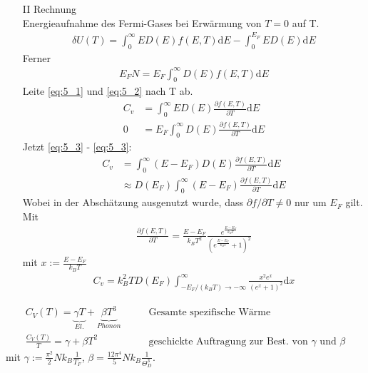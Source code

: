 \begin{itemize}
\begin{itemize}
            \item[II] Rechnung \\
                Energieaufnahme des Fermi-Gases bei Erwärmung von $T=0$ auf T. \\
                \begin{align}
                    \delta U(T) = \int_0^\infty E D(E) f(E,T) \mathrm{d}E - \int_0^{E_F} E D(E) \mathrm{d}E \label{eq:5_1}
                \end{align} 
                Ferner
                \begin{align}
                    E_F N = E_F \int_0^\infty D(E) f(E,T) \mathrm{d} E \label{eq:5_2}
                \end{align}
                Leite \ref{eq:5_1} und \ref{eq:5_2} nach T ab.
                \begin{align}
                    C_v &= \int_0^\infty E D(E) \frac{\partial f(E,T)}{\partial T} \mathrm{d}E \label{eq:5_3} \\
                    0 &= E_F \int_0^\infty D(E) \frac{\partial f(E,T)}{\partial T} \mathrm{d}E \label{eq:5_4}
                \end{align} 
                Jetzt \ref{eq:5_3} - \ref{eq:5_3}:
                \begin{align}
                    C_v &= \int_0^\infty (E - E_F) D(E) \frac{\partial f(E,T)}{\partial T} \mathrm{d}E \\
                    &\approx D(E_F) \int_0^\infty (E - E_F) \frac{\partial f(E,T)}{\partial T} \mathrm{d}E
                \end{align}
                Wobei in der Abschätzung ausgenutzt wurde, dass $\partial f/\partial T \neq 0 $ nur um $E_F$ gilt. Mit
                \begin{align}
                    \frac{\partial f(E,T)}{\partial T} = \frac{E-E_F}{k_B T^2} \frac{e^{\frac{E-E_F}{k_BT}}}{\left(e^{\frac{E-E_F}{k_BT}} + 1\right)^2}
                \end{align}
                mit $x := \frac{E-E_F}{k_B T}$
                \begin{align}
                C_v = k_B^2 T D(E_F) \int_{-E_F / (k_B T) \rightarrow - \infty}^\infty \frac{x^2e^x}{(e^x+1)^2}\mathrm{d}x
                \end{align}
                {\centering
                }
        \end{itemize}
\begin{align*}
    C_V(T) = \underbrace{\gamma T}_{El.} + \underbrace{\beta T^3}_{Phonon} \qquad &\text{Gesamte spezifische Wärme}\\
    \frac{C_V(T)}{T} = \gamma + \beta T^2 \qquad &\text{geschickte Auftragung zur Best. von $\gamma$ und $\beta$}
\end{align*}
mit $\gamma := \frac{\pi^2}{2}N k_B \frac{1}{T_F}$, $\beta = \frac{12 \pi^4}{5} N k_B \frac{1}{\Theta_D^3}$.\\


\end{itemize}
